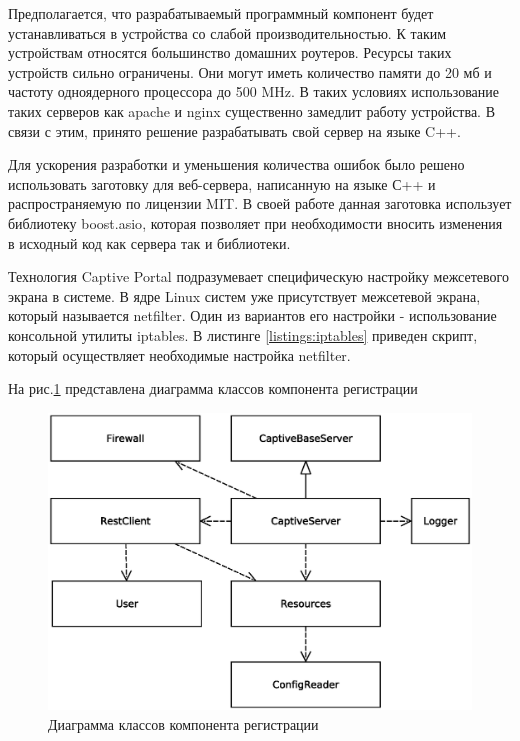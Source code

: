 Предполагается, что разрабатываемый программный компонент будет устанавливаться в устройства со слабой производительностью. К таким устройствам относятся большинство домашних роутеров. Ресурсы таких устройств сильно ограничены. Они могут иметь количество памяти до 20 мб и частоту одноядерного процессора до 500 MHz. В таких условиях использование таких серверов как apache и nginx существенно замедлит работу устройства. В связи с этим, принято решение разрабатывать свой сервер на языке C++.

Для ускорения разработки и уменьшения количества ошибок было решено использовать заготовку для веб-сервера\cite{simpleServer}, написанную на языке С++ и распространяемую по лицензии MIT\cite{simpleServerMIT}. В своей работе данная заготовка использует библиотеку boost.asio\cite{boost}, которая позволяет при необходимости вносить изменения в исходный код как сервера так и библиотеки.

Технология Captive Portal подразумевает специфическую настройку межсетевого экрана в системе. В ядре Linux систем уже присутствует межсетевой экрана, который называется netfilter. Один из вариантов его настройки - использование консольной утилиты iptables. В листинге \ref{listings:iptables} приведен скрипт, который осуществляет необходимые настройка netfilter.

На рис.\ref{fig:CPUML} представлена диаграмма классов компонента регистрации

\begin{figure}[H]
	\centering
	\includegraphics[width=\linewidth]{fig/CPUML}
	\caption{Диаграмма классов компонента регистрации}
	\label{fig:CPUML}
\end{figure}

